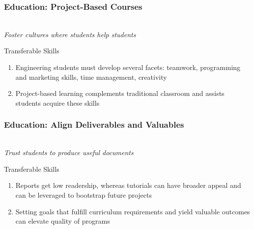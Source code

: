 \documentclass{beamer}
\begin{document}
\begin{frame}
  \frametitle{Education: Project-Based Courses}

  \begin{center}
  \scalebox{0.5}{} \\
  \emph{Foster cultures where students help students}
  \end{center}
  \begin{block}{Transferable Skills}
    \begin{enumerate}
    \item Engineering students must develop several facets: teamwork, programming and marketing skills, time management, creativity
    \item Project-based learning complements traditional classroom and assists students acquire these skills
    \end{enumerate}
  \end{block}
\end{frame}

\begin{frame}
  \frametitle{Education: Align Deliverables and Valuables}

  \begin{center}
  \scalebox{0.5}{} \\
  \emph{Trust students to produce useful documents}
  \end{center}
  \begin{block}{Transferable Skills}
    \begin{enumerate}
    \item Reports get low readership, whereas tutorials can have broader appeal and can be leveraged to bootstrap future projects
    \item Setting goals that fulfill curriculum requirements and yield valuable outcomes can elevate quality of programs
    \end{enumerate}
  \end{block}
\end{frame}
\end{document}
